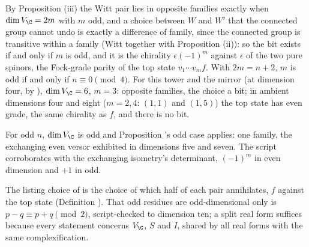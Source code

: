 By Proposition (iii) the Witt pair lies in opposite families exactly when $\dim V_{\C} = 2m$ with $m$ odd, and a choice between $W$ and $W'$ that the connected group cannot undo is exactly a difference of family, since the connected group is transitive within a family (Witt together with Proposition (ii)): so the bit exists if and only if $m$ is odd, and it is the chirality $\epsilon(-1)^{m}$ against $\epsilon$ of the two pure spinors, the Fock-grade parity of the top state $v_{1}\cdots v_{m}f$. With $2m = n + 2$, $m$ is odd if and only if $n \equiv 0 \pmod 4$. For this tower and the mirror (at dimension four, by ), $\dim V_{\C} = 6$, $m = 3$: opposite families, the choice a bit; in ambient dimensions four and eight ($m = 2, 4$: $(1,1)$ and $(1,5)$) the top state has even grade, the same chirality as $f$, and there is no bit.

For odd $n$, $\dim V_{\C}$ is odd and Proposition 's odd case applies: one family, the exchanging even versor exhibited in dimensions five and seven. The script corroborates with the exchanging isometry's determinant, $(-1)^{m}$ in even dimension and $+1$ in odd.

The listing choice of \cite[Prop.~5.6]{ButlerT12} is the choice of which half of each pair annihilates, $f$ against the top state (Definition ). That odd residues are odd-dimensional only is $p - q \equiv p + q \pmod 2$, script-checked to dimension ten; a split real form suffices because every statement concerns $V_{\C}$, $S$ and $I$, shared by all real forms with the same complexification.
